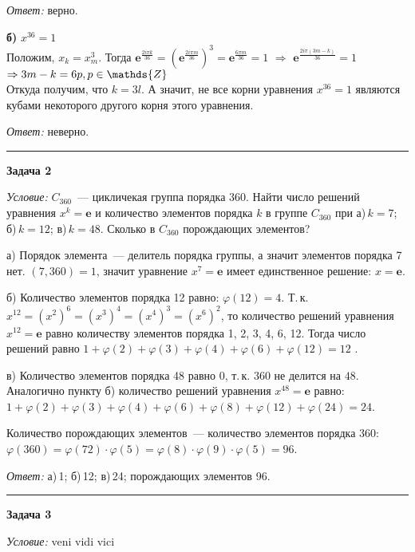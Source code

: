 \documentclass[12pt,a4paper]{article}
\newcommand{\sbs}{\large \bfseries}
\newcommand{\rl}{\vspace{16pt} \hrule \vspace{8pt}}
\newcommand{\ve}{\boldsymbol{e}}
\begin{document}
{\itshape Ответ: } верно.

\textbf{б)} $x^ {36} = 1$
\\Положим, $x_k=x_m^3$. Тогда $\displaystyle \ve^{\frac{2i\pi k}{36}}=(\ve^{\frac{2i\pi m}{36}})^{3}=\ve^{\frac{6\pi m}{36}}=1$ $\Rightarrow$ $\ve^{\frac{2i \pi (3m-k)}{36}}=1$ $\Rightarrow \\3m-k=6p,  p\in \mathds{Z}$
\\ Откуда получим, что $k = 3l$. А значит, не все корни уравнения $x^ {36} = 1$ являются кубами некоторого другого корня этого уравнения.

{\itshape Ответ: } неверно.





\rl
{\sbs Задача 2}

{\itshape Условие: } $C_{360}$~--- цикличекая группа порядка 360. Найти число решений уравнения $x^k=\boldsymbol{e}$ и количество элементов порядка $k$ в группе $C_{360}$ при а)\,$k = 7$; б)\,$k = 12$; в)\,$k = 48$. Сколько в $C_{360}$ порождающих элементов?

а) Порядок элемента~--- делитель порядка группы, а значит элементов порядка 7 нет. $(7, 360) = 1$, значит уравнение $x^7 = \boldsymbol{e}$ имеет единственное решение: $x = \boldsymbol{e}$.

б) Количество элементов порядка 12 равно: $\varphi (12) = 4$. Т.\,к. $x^{12} = (x^2)^6 = (x^3)^4 = (x^4)^3 = (x^6)^2$, то количество решений уравнения $x^{12} = \boldsymbol{e}$ равно количеству элементов порядка 1, 2, 3, 4, 6, 12. Тогда число решений равно $1 + \varphi(2) + \varphi(3) + \varphi(4) + \varphi(6) + \varphi(12) = 12$ .\par
в) Количество элементов порядка 48 равно 0, т.\,к. $360$ не делится на $48$. Аналогично пункту б) количество решений уравнения $x^{48} = \boldsymbol{e}$ равно:\\
$1 + \varphi(2) + \varphi(3) + \varphi(4) + \varphi(6) + \varphi(8) + \varphi(12) + \varphi(24) = 24$.\par
Количество порождающих элементов~--- количество элементов порядка 360:\\
$\varphi(360) = \varphi(72)\cdot\varphi(5) =\varphi(8)\cdot\varphi(9)\cdot\varphi(5) = 96$.

{\itshape Ответ: } а)\,1; б)\,12; в)\,24; порождающих элементов 96.




\rl
{\sbs Задача 3}

{\itshape Условие: } veni vidi vici
\end{document}
